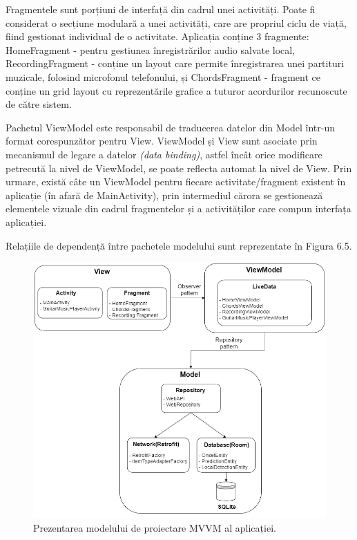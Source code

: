 \documentclass[a4paper,12pt]{report}
\begin{document}
Fragmentele sunt porțiuni de interfață din cadrul unei activități.
Poate fi considerat o secțiune modulară a unei activități, care are 
propriul ciclu de viață, fiind gestionat individual de o activitate.
Aplicația conține 3 fragmente: HomeFragment - pentru gestiunea 
înregistrărilor audio salvate local, RecordingFragment - conține 
un layout care permite înregistrarea unei partituri muzicale, 
folosind microfonul telefonului, și ChordsFragment - fragment 
ce conține un grid layout cu reprezentările grafice a tuturor
acordurilor recunoscute de către sistem.

Pachetul ViewModel este responsabil de traducerea datelor 
din Model într-un format corespunzător pentru View. ViewModel
și View sunt asociate prin mecanismul de legare a datelor \emph{(data 
binding)}, astfel încât orice modificare petrecută la nivel de 
ViewModel, se poate reflecta automat la nivel de View. Prin urmare, 
există câte un ViewModel pentru fiecare activitate/fragment 
existent în aplicație (în afară de MainActivity), prin intermediul cărora
se gestionează elementele vizuale din cadrul fragmentelor și a 
activităților care compun interfața aplicației. 

Relațiile de dependență între pachetele modelului 
sunt reprezentate în Figura 6.5.

\begin{figure}[h!]
    \centering
    \includegraphics[width=14cm]{..//resources//images//mvvm_mobile2.png} 
    \caption{Prezentarea modelului de proiectare MVVM al aplicației.}
\end{figure}
\end{document}
